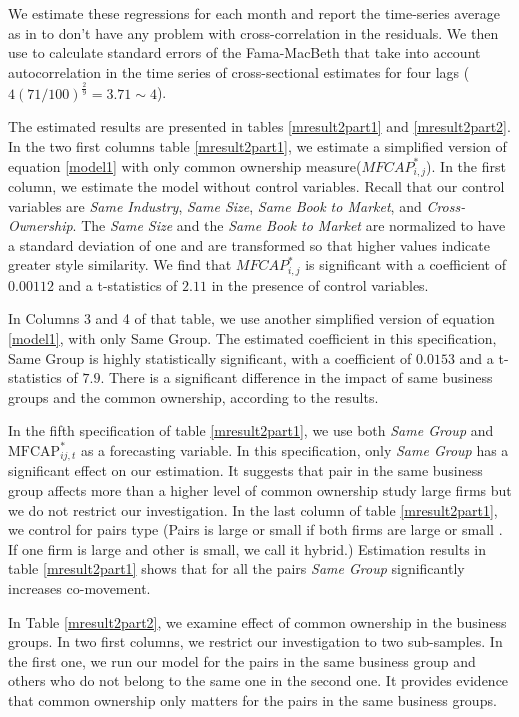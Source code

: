 	We estimate these regressions for each month and report the time-series average as in \cite{FamaMacBeth} to don't have any problem with cross-correlation in the residuals. We then use  \cite{newey1987hypothesis} to calculate standard errors of the Fama-MacBeth that take into account autocorrelation in the time series of cross-sectional estimates for four lags ($ 4(71/100)^{\frac{2}{9}} = 3.71 \sim 4 $).
	
	The estimated results are presented in tables \ref{mresult2part1}
	and \ref{mresult2part2}.
	In the two first columns table \ref{mresult2part1}, we estimate a simplified version of equation \ref{model1} with only common ownership measure($ MFCAP^*_{i,j}$). In the first column, we estimate the model without control variables. Recall that our control variables are \textit{Same Industry}, \textit{Same Size}, \textit{Same Book to Market}, and \textit{Cross-Ownership}. The \textit{Same Size} and the \textit{Same Book to Market} are normalized to have a standard deviation of one and are transformed so that higher values indicate greater style similarity.  We find that $ MFCAP^*_{i,j}$ is significant with a coefficient of $0.00112$ and a t-statistics of $2.11$ in the presence of control variables. 
	
	
	In Columns 3 and 4 of that table, we use another simplified version of equation \ref{model1}, with only Same Group. The estimated coefficient in this specification, Same Group is highly statistically significant, with a coefficient of   $0.0153$ and a t-statistics of $7.9$. 
	There is a significant difference in the impact of same business groups and the common ownership, according to the results. 
	
	In the fifth specification of table \ref{mresult2part1}, we use both \textit{Same Group}  and $\text{MFCAP}^*_{ij,t}$ as a forecasting variable. In this specification, only  \textit{Same Group} has a significant effect on our estimation. It suggests that pair in the same business group affects more than a higher level of common ownership
	\cite{AntonPolk} study large firms but we do not restrict  our investigation. In the last column of table \ref{mresult2part1}, we control for pairs type (Pairs is large or small if both firms are large or  small . If one firm is large and other is small, we call it hybrid.) Estimation results in table \ref{mresult2part1} shows that for all the pairs \textit{Same Group} significantly increases co-movement.
	
	In Table  \ref{mresult2part2}, we examine effect of common ownership in the business groups. In two first columns, we restrict our investigation to two sub-samples. In the first one, we run our model for the pairs in the same business group and others who do not belong to the same one in the second one. It provides evidence that common ownership only matters for the pairs in the same business groups. 
	
